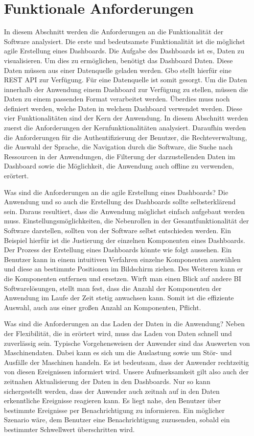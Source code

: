 \section{Funktionale Anforderungen}
\label{sec:funktionaleanforderungen}
In diesem Abschnitt werden die Anforderungen an die Funktionalität der Software analysiert.
Die erste und bedeutsamste Funktionalität ist
die möglichst agile Erstellung eines Dashboards. Die Aufgabe des Dashboards ist es, Daten
zu visualisieren. Um dies zu ermöglichen, benötigt das Dashboard Daten. Diese Daten
müssen aus einer Datenquelle geladen werden. Gbo stellt hierfür eine REST API
zur Verfügung. Für eine Datenquelle ist somit gesorgt. Um die Daten innerhalb der Anwendung
einem Dashboard zur Verfügung zu stellen, müssen die Daten zu einem passenden Format verarbeitet werden.
Überdies muss noch definiert werden, welche Daten in welchem Dashboard verwendet
werden. Diese vier Funktionalitäten sind der Kern der Anwendung. In diesem Abschnitt
werden zuerst die Anforderungen der Kernfunktionalitäten analysiert. Daraufhin werden die Anforderungen
für die Authentifizierung der Benutzer, die Rechteverwaltung, die Auswahl der Sprache,
die Navigation durch die Software, die Suche nach Ressourcen in der Anwendungen,
die Filterung der darzustellenden Daten im Dashboard sowie die Möglichkeit,
die Anwendung auch offline zu verwenden, erörtert.

Was sind die Anforderungen an die agile Erstellung eines Dashboards? Die Anwendung und
so auch die Erstellung des Dashboards sollte selbsterklärend sein. Daraus resultiert, 
dass die Anwendung möglichst einfach aufgebaut werden muss. Einstellungsmöglichkeiten,
die Nebenrollen in der Gesamtfunktionalität der Software darstellen, sollten von der
Software selbst entschieden werden. Ein Beispiel hierfür ist die Justierung der
einzelnen Komponenten eines Dashboards. Der Prozess der Erstellung eines Dashboards
könnte wie folgt aussehen. Ein Benutzer kann in einem intuitiven Verfahren
einzelne Komponenten auswählen und diese an bestimmte Positionen im Bildschirm
ziehen. Des Weiteren kann er die Komponenten
entfernen und ersetzen. Wirft man einen Blick auf andere BI Softwarelösungen,
stellt man fest, dass die Anzahl der Komponenten der Anwendung im Laufe der Zeit
stetig anwachsen kann. Somit ist die effiziente Auswahl, auch aus einer großen
Anzahl an Komponenten, Pflicht.

Was sind die Anforderungen an das Laden der Daten in die Anwendung? Neben der Flexibilität,
die in  erörtert wird, muss das Laden von Daten schnell und zuverlässig
sein. Typische Vorgehensweisen der Anwender sind das Auswerten von Maschinendaten. Dabei kann es
sich um die Auslastung sowie um Stör- und Ausfälle der Maschinen handeln. Es ist bedeutsam,
dass der Anwender rechtzeitig von diesen Ereignissen informiert wird. Unsere
Aufmerksamkeit gilt also auch der zeitnahen Aktualisierung der Daten in den Dashboards. Nur
so kann sichergestellt werden, dass der Anwender auch zeitnah auf in den Daten erkenntliche
Ereignisse reagieren kann. Es liegt nahe, den Benutzer
über bestimmte Ereignisse per Benachrichtigung zu informieren. Ein möglicher Szenario wäre,
dem Benutzer eine Benachrichtigung zuzusenden, sobald ein bestimmter Schwellwert überschritten
wird.

